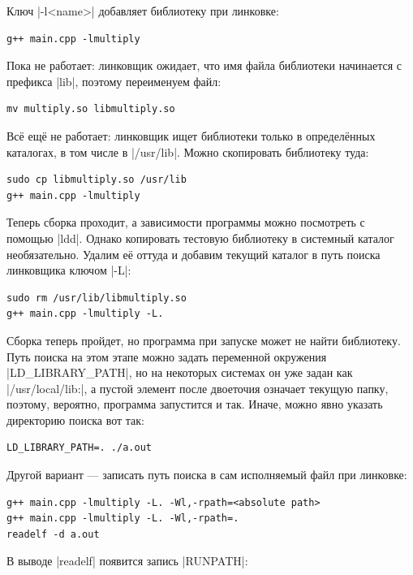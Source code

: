 \documentclass[11pt]{article}
\begin{document}
Ключ \nolint|-l<name>| добавляет библиотеку при линковке:

\begin{lstlisting}
g++ main.cpp -lmultiply
\end{lstlisting}

Пока не работает: линковщик ожидает, что имя файла библиотеки начинается с префикса
\nolint|lib|, поэтому переименуем файл:

\begin{lstlisting}
mv multiply.so libmultiply.so
\end{lstlisting}

Всё ещё не работает: линковщик ищет библиотеки только в определённых каталогах, в том числе
в \nolint|/usr/lib|. Можно скопировать библиотеку туда:

\begin{lstlisting}
sudo cp libmultiply.so /usr/lib
g++ main.cpp -lmultiply
\end{lstlisting}

Теперь сборка проходит, а зависимости программы можно посмотреть с помощью \nolint|ldd|. Однако
копировать тестовую библиотеку в системный каталог необязательно. Удалим её оттуда и добавим
текущий каталог в путь поиска линковщика ключом \nolint|-L|:

\begin{lstlisting}
sudo rm /usr/lib/libmultiply.so
g++ main.cpp -lmultiply -L.
\end{lstlisting}

Сборка теперь пройдет, но программа при запуске может не найти библиотеку. Путь
поиска на этом этапе можно задать переменной окружения \nolint|LD_LIBRARY_PATH|, но на некоторых системах он уже задан как \nolint|/usr/local/lib:|, а пустой элемент после двоеточия означает текущую папку, поэтому, вероятно, программа запустится и так. Иначе, можно явно указать директорию поиска вот так:

\begin{lstlisting}
LD_LIBRARY_PATH=. ./a.out
\end{lstlisting}

Другой вариант --- записать путь поиска в сам исполняемый файл при линковке:

\begin{lstlisting}
g++ main.cpp -lmultiply -L. -Wl,-rpath=<absolute path>
g++ main.cpp -lmultiply -L. -Wl,-rpath=.
readelf -d a.out
\end{lstlisting}

В выводе \nolint|readelf| появится запись \nolint|RUNPATH|:
\end{document}
